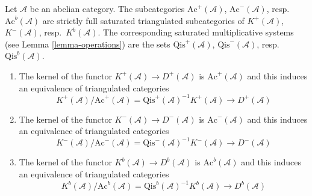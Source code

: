 \begin{lemma}
\label{lemma-bounded-derived}
Let $\mathcal{A}$ be an abelian category. The subcategories
$\text{Ac}^{+}(\mathcal{A})$, $\text{Ac}^{-}(\mathcal{A})$,
resp.\ $\text{Ac}^b(\mathcal{A})$
are strictly full saturated triangulated subcategories
of $K^{+}(\mathcal{A})$, $K^{-}(\mathcal{A})$, resp.\ $K^b(\mathcal{A})$.
The corresponding saturated multiplicative systems (see
Lemma \ref{lemma-operations})
are the sets $\text{Qis}^{+}(\mathcal{A})$, $\text{Qis}^{-}(\mathcal{A})$,
resp.\ $\text{Qis}^b(\mathcal{A})$.
\begin{enumerate}
\item The kernel of the functor $K^{+}(\mathcal{A}) \to D^{+}(\mathcal{A})$
is $\text{Ac}^{+}(\mathcal{A})$ and this induces an equivalence
of triangulated categories
$$
K^{+}(\mathcal{A})/\text{Ac}^{+}(\mathcal{A}) =
\text{Qis}^{+}(\mathcal{A})^{-1}K^{+}(\mathcal{A})
\longrightarrow
D^{+}(\mathcal{A})
$$
\item The kernel of the functor $K^{-}(\mathcal{A}) \to D^{-}(\mathcal{A})$
is $\text{Ac}^{-}(\mathcal{A})$ and this induces an equivalence
of triangulated categories
$$
K^{-}(\mathcal{A})/\text{Ac}^{-}(\mathcal{A}) =
\text{Qis}^{-}(\mathcal{A})^{-1}K^{-}(\mathcal{A})
\longrightarrow
D^{-}(\mathcal{A})
$$
\item The kernel of the functor $K^b(\mathcal{A}) \to D^b(\mathcal{A})$
is $\text{Ac}^b(\mathcal{A})$ and this induces an equivalence
of triangulated categories
$$
K^b(\mathcal{A})/\text{Ac}^b(\mathcal{A}) =
\text{Qis}^b(\mathcal{A})^{-1}K^b(\mathcal{A})
\longrightarrow
D^b(\mathcal{A})
$$
\end{enumerate}
\end{lemma}

